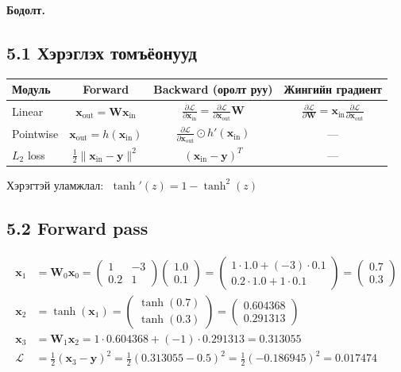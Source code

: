 \documentclass[11pt]{article}
\newenvironment{solution}[1][\textbf{Бодолт.}]
    { \noindent #1 \smallskip \\ }
    { \medskip }
\newcommand{\xin}{\mathbf{x}_{\mathrm{in}}}
\newcommand{\xout}{\mathbf{x}_{\mathrm{out}}}
\newcommand{\dL}[1]{\frac{\partial \mathcal{L}}{\partial #1}}
\begin{document}
\begin{solution}
\subsection*{5.1 Хэрэглэх томъёонууд}
\begin{center}
\begin{tabular}{lccc}
\toprule
\textbf{Модуль} & \textbf{Forward} & \textbf{Backward (оролт руу)} & \textbf{Жингийн градиент} \\
\midrule
Linear    & $\xout = \mathbf{W}\xin$ & $\dL{\xin}=\dL{\xout}\mathbf{W}$ & $\dL{\mathbf{W}}=\xin\dL{\xout}$ \\[3pt]
Pointwise & $\xout = h(\xin)$        & $\dL{\xout}\odot h'(\xin)$       & --- \\[3pt]
$L_2$ loss& $\tfrac12\|\xin-\mathbf{y}\|^2$ & $(\xin-\mathbf{y})^T$     & --- \\
\bottomrule
\end{tabular}
\end{center}
Хэрэгтэй уламжлал: $\;\tanh'(z) = 1 - \tanh^2(z)$

\subsection*{5.2 Forward pass}
\begin{align}
\mathbf{x}_1 &= \mathbf{W}_0\mathbf{x}_0
= \begin{pmatrix} 1 & -3 \\ 0.2 & 1 \end{pmatrix}
  \begin{pmatrix} 1.0 \\ 0.1 \end{pmatrix}
= \begin{pmatrix} 1\cdot1.0 + (-3)\cdot 0.1 \\ 0.2\cdot 1.0 + 1\cdot 0.1 \end{pmatrix}
= \begin{pmatrix} 0.7 \\ 0.3 \end{pmatrix} \\[6pt]
\mathbf{x}_2 &= \tanh(\mathbf{x}_1)
= \begin{pmatrix} \tanh(0.7) \\ \tanh(0.3) \end{pmatrix}
= \begin{pmatrix} 0.604368 \\ 0.291313 \end{pmatrix} \\[6pt]
\mathbf{x}_3 &= \mathbf{W}_1\mathbf{x}_2
= 1\cdot 0.604368 + (-1)\cdot 0.291313 = 0.313055 \\[6pt]
\mathcal{L} &= \tfrac12(\mathbf{x}_3 - \mathbf{y})^2
= \tfrac12(0.313055 - 0.5)^2 = \tfrac12(-0.186945)^2 = \mathbf{0.017474}
\end{align}


\end{solution}
\end{document}
